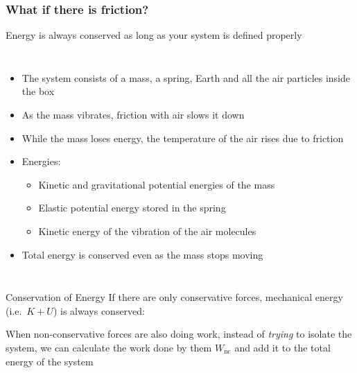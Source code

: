 \documentclass[12pt,compress,aspectratio=169]{beamer}
\newcommand{\eq}[2]{\vspace{#1}{\Large\begin{displaymath}#2\end{displaymath}}}
\begin{document}
\begin{frame}
  \frametitle{What if there is friction?}
  Energy is always conserved as long as your system is defined properly

  \begin{columns}
    \begin{itemize}
    \item The system consists of a mass, a spring, Earth and all the air
      particles inside the box
    \item As the mass vibrates, friction with air slows it down
    \item While the mass loses energy, the temperature of the air rises due to
      friction
    \item Energies:
      \begin{itemize}
      \item Kinetic and gravitational potential energies of the mass
      \item Elastic potential energy stored in the spring
      \item Kinetic energy of the vibration of the air molecules
      \end{itemize}
    \item Total energy is conserved even as the mass stops moving
    \end{itemize}
  \end{columns}
\end{frame}


\begin{frame}{Conservation of Energy}
  If there are only conservative forces, mechanical energy (i.e.\ $K+U$) is
  always conserved:

  \eq{-.4in}{
    \boxed{K +U =K'+U'}
  }
  
  \vspace{-.15in}When non-conservative forces are also doing work, instead of
  \emph{trying} to isolate the system, we can calculate the work done by them
  $W_{\textrm{nc}}$ and add it to the total energy of the system
    
  \eq{-.4in}{
    \boxed{K+U+W_{\textrm{nc}}=K'+U'}
  }
\end{frame}
\end{document}
